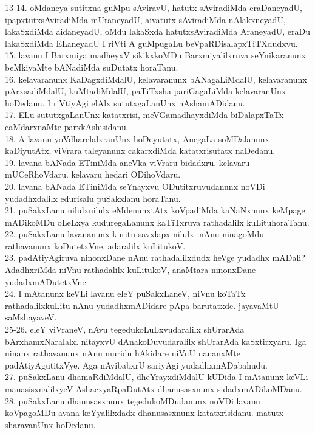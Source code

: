 \documentclass{article}
\begin{document}
13-14. oMdaneya sutitxna guMpu sAviravU, hatutx sAviradiMda eraDaneyadU, ipapxtutxsAviradiMda mUraneyadU, aivatutx sAviradiMda nAlakxneyadU, lakaSxdiMda aidaneyadU, oMdu lakaSxda hatutxsAviradiMda AraneyadU, eraDu lakaSxdiMda ELaneyadU I riVti A guMpugaLu beVpaRDisalapxTiTXdudxvu.\\
15. lavanu I Barxmiya madheyxV sikikxkoMDu Barxmiyalilxruva seYnikaranunx beMkiyaMte bANadiMda suDutatx horaTanu.\\
16. kelavaranunx KaDagxdiMdalU, kelavaranunx bANagaLiMdalU, kelavaranunx pArxsadiMdalU, kuMtadiMdalU, paTiTxsha pariGagaLiMda kelavaranUnx hoDedanu. I riVtiyAgi elAlx sututxgaLanUnx nAshamADidanu.\\
17. ELu sututxgaLanUnx katatxrisi, meVGamadhayxdiMda biDalapxTaTx caMdarxnaMte parxkAshisidanu.\\
18. A lavanu yoVdharelalxranUnx hoDeyutatx, AnegaLa soMDalanunx kaDiyutAtx, viVrara taleyanunx cakarxdiMda katatxrisutatx naDedanu.\\
19. lavana bANada ETiniMda aneVka viVraru bidadxru. kelavaru mUCeRhoVdaru. kelavaru hedari ODihoVdaru.\\
20. lavana bANada ETiniMda seYnayxvu ODutitxruvudanunx noVDi yudadhxdalilx edurisalu puSakxlanu horaTanu.\\
21. puSakxLanu nilulxnilulx eMdenunxtAtx koVpadiMda kaNaNxnunx keMpage mADikoMDu oLeLxya kuduregaLanunx kaTiTxruva rathadalilx kuLituhoraTanu.\\
22. puSakxLanu lavananunx kuritu savxlapx nilulx. nAnu ninagoMdu rathavanunx koDutetxVne, adaralilx kuLitukoV.\\
23. padAtiyAgiruva ninonxDane nAnu rathadalilxdudx heVge yudadhx mADali? AdadhxriMda niVnu rathadalilx kuLitukoV, anaMtara ninonxDane yudadxmADutetxVne.\\
24. I mAtanunx keVLi lavanu eleY puSakxLaneV, niVnu koTaTx rathadalilxkuLitu nAnu yudadhxmADidare pApa barutatxde. jayavaMtU saMshayaveV.\\
25-26. eleY viVraneV, nAvu tegedukoLuLxvudaralilx shUrarAda bArxhamxNaralalx. nitayxvU dAnakoDuvudaralilx shUrarAda kaSxtirxyaru. Iga ninanx rathavanunx nAnu muridu hAkidare niVnU nananxMte padAtiyAgutitxVye. Aga nAvibabxrU sariyAgi yudadhxmADabahudu.\\
27. puSakxLanu dhamaRdiMdalU, dheYrayxdiMdalU kUDida I mAtanunx keVLi manasisxnalilxyeV AshacxyaRpaDutAtx dhanusasxnunx sidadxmADikoMDanu.\\
28. puSakxLanu dhanusasxnunx tegedukoMDudanunx noVDi lavanu koVpagoMDu avana keYyalilxdadx dhanusasxnunx katatxrisidanu. matutx sharavanUnx hoDedanu.\\
\end{document}
